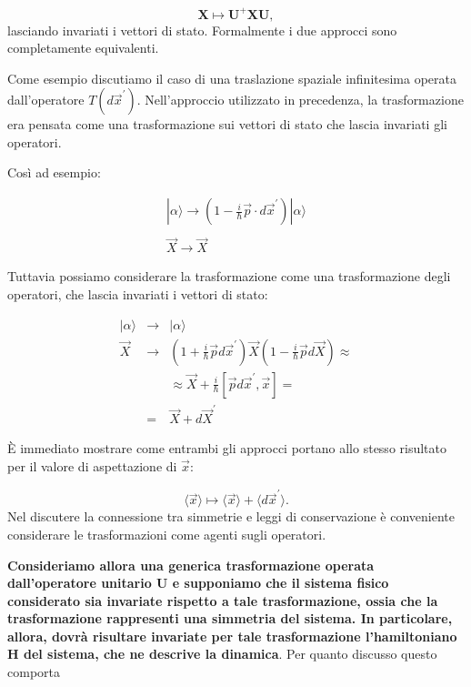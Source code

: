 \begin{equation}
\label{eq:cap12_4}
\textbf{X}\mapsto \textbf{U}^+ \textbf{X}\textbf{U},
\end{equation}
lasciando invariati i vettori di stato. Formalmente i due approcci sono completamente equivalenti.

Come esempio discutiamo il caso di una traslazione spaziale infinitesima operata dall'operatore $T(d\vec{x}^{'})$.
Nell'approccio utilizzato in precedenza, la trasformazione era pensata come una trasformazione sui vettori di stato che lascia invariati gli operatori.

Così ad esempio:

\begin{eqnarray}
  &|\alpha \rangle \rightarrow (1- \frac{i}{\hbar}\vec{p}\cdot d\vec{x}^{'}) |\alpha \rangle &  \\
	\nonumber \\
 & \vec{X}\rightarrow \vec{X}  & 
\end{eqnarray}

Tuttavia possiamo considerare la trasformazione come una trasformazione degli operatori, che lascia invariati i vettori di stato:

\begin{eqnarray}
	|\alpha \rangle &\rightarrow & |\alpha \rangle \\
	\vec{X} &\rightarrow& (1+ \frac{i}{\hbar} \vec{p} d\vec{x}^{'}) \vec{X} (1-\frac{i}{\hbar} \vec{p} d\vec{X}) \approx \nonumber\\
	& &\approx \vec{X}+ \frac{i}{\hbar}[\vec{p} d\vec{x}^{'},\vec{x}]= \nonumber  \\
	&=&\vec{X}+ d\vec{X}^{'}
\end{eqnarray}

È immediato mostrare come entrambi gli approcci portano allo stesso risultato per il valore di aspettazione di $\vec{x}$:

\begin{equation}
\langle \vec{x} \rangle  \mapsto \langle \vec{x}\rangle + \langle d\vec{x}^{'} \rangle.
\end{equation}
Nel discutere la connessione tra simmetrie e leggi di conservazione è conveniente considerare le trasformazioni come agenti sugli operatori.

\textbf{Consideriamo allora una generica trasformazione operata dall'operatore unitario $\textbf{U}$ e supponiamo che il sistema fisico considerato sia invariate rispetto a tale trasformazione, ossia che la trasformazione rappresenti una simmetria del sistema.
In particolare, allora, dovrà risultare invariate per tale trasformazione l'hamiltoniano H del sistema, che ne descrive la dinamica}. Per quanto discusso questo comporta

